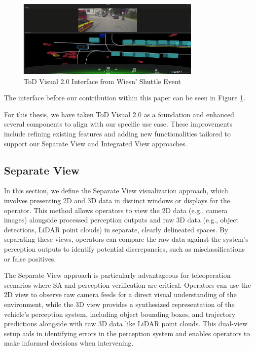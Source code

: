\begin{figure}
    \includegraphics[width=0.8\textwidth]{figures/tod_visual.png}
    \centering
    \caption{ToD Visual 2.0 Interface from Wiesn' Shuttle Event}
    \label{fig:ToDVisual}
\end{figure}

The interface before our contribution within this paper can be seen in Figure \ref{fig:ToDVisual}.

For this thesis, we have taken ToD Visual 2.0 as a foundation and enhanced several components to align with our specific use case. These improvements include refining existing features and adding new functionalities tailored to support our Separate View and Integrated View approaches.


\subsection{Separate View}\label{section:separateview}
In this section, we define the Separate View visualization approach, which involves presenting 2D and 3D data in distinct windows or displays for the operator. This method allows operators to view the 2D data (e.g., camera images) alongside processed perception outputs and raw 3D data (e.g., object detections, \ac{LiDAR} point clouds) in separate, clearly delineated spaces. By separating these views, operators can compare the raw data against the system's perception outputs to identify potential discrepancies, such as misclassifications or false positives.

The Separate View approach is particularly advantageous for teleoperation scenarios where \ac{SA} and perception verification are critical. Operators can use the 2D view to observe raw camera feeds for a direct visual understanding of the environment, while the 3D view provides a synthesized representation of the vehicle's perception system, including object bounding boxes, and trajectory predictions alongside with raw 3D data like \ac{LiDAR} point clouds. This dual-view setup aids in identifying errors in the perception system and enables operators to make informed decisions when intervening.
